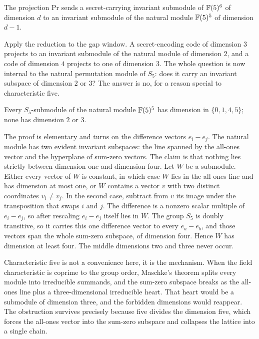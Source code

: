 \begin{lemma}
  \label{lem:reduction}
  \rocqok
  The projection $\mathrm{Pr}$ sends a secret-carrying invariant submodule of
  $\mathbb{F}(5)^6$ of dimension $d$ to an invariant submodule of the natural module
  $\mathbb{F}(5)^5$ of dimension $d-1$.
\end{lemma}

Apply the reduction to the gap window. A secret-encoding code of dimension $3$
projects to an invariant submodule of the natural module of dimension $2$, and a
code of dimension $4$ projects to one of dimension $3$. The whole question is now
internal to the natural permutation module of $S_5$: does it carry an invariant
subspace of dimension $2$ or $3$? The answer is no, for a reason special to
characteristic five.

\begin{theorem}
  \label{thm:kernel_fact}
  \rocqok
  Every $S_5$-submodule of the natural module $\mathbb{F}(5)^5$ has dimension in
  $\{0,1,4,5\}$; none has dimension $2$ or $3$.
\end{theorem}

The proof is elementary and turns on the difference vectors $e_i - e_j$. The
natural module has two evident invariant subspaces: the line spanned by the
all-ones vector and the hyperplane of sum-zero vectors. The claim is that nothing
lies strictly between dimension one and dimension four. Let $W$ be a submodule.
Either every vector of $W$ is constant, in which case $W$ lies in the all-ones
line and has dimension at most one, or $W$ contains a vector $v$ with two
distinct coordinates $v_i \ne v_j$. In the second case, subtract from $v$ its
image under the transposition that swaps $i$ and $j$. The difference is a nonzero
scalar multiple of $e_i - e_j$, so after rescaling $e_i - e_j$ itself lies in
$W$. The group $S_5$ is doubly transitive, so it carries this one difference
vector to every $e_a - e_b$, and those vectors span the whole sum-zero subspace,
of dimension four. Hence $W$ has dimension at least four. The middle dimensions
two and three never occur.

Characteristic five is not a convenience here, it is the mechanism. When the
field characteristic is coprime to the group order, Maschke's theorem splits
every module into irreducible summands, and the sum-zero subspace breaks as the
all-ones line plus a three-dimensional irreducible heart. That heart would be a
submodule of dimension three, and the forbidden dimensions would reappear. The
obstruction survives precisely because five divides the dimension five, which
forces the all-ones vector into the sum-zero subspace and collapses the lattice
into a single chain.

